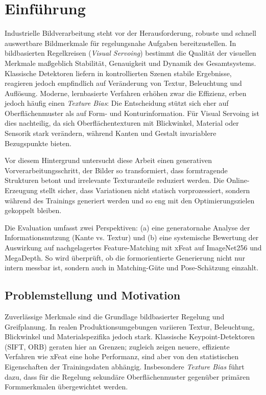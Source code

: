 \chapter{Einführung}
\label{ch:Einfuehrung}

Industrielle Bildverarbeitung steht vor der Herausforderung, robuste und schnell auswertbare Bildmerkmale für regelungsnahe Aufgaben bereitzustellen. In bildbasierten Regelkreisen (\emph{Visual Servoing}) bestimmt die Qualität der visuellen Merkmale maßgeblich Stabilität, Genauigkeit und Dynamik des Gesamtsystems. Klassische Detektoren liefern in kontrollierten Szenen stabile Ergebnisse, reagieren jedoch empfindlich auf Veränderung von Textur, Beleuchtung und Auflösung. Moderne, lernbasierte Verfahren erhöhen zwar die Effizienz, erben jedoch häufig einen \emph{Texture Bias}: Die Entscheidung stützt sich eher auf Oberflächenmuster als auf Form- und Konturinformation. Für Visual Servoing ist dies nachteilig, da sich Oberflächentexturen mit Blickwinkel, Material oder Sensorik stark verändern, während Kanten und Gestalt invariablere Bezugspunkte bieten.

Vor diesem Hintergrund untersucht diese Arbeit einen generativen Vorverarbeitungsschritt, der Bilder so transformiert, dass formtragende Strukturen betont und irrelevante Texturanteile reduziert werden. Die Online-Erzeugung stellt sicher, dass Variationen nicht statisch vorprozessiert, sondern während des Trainings generiert werden und so eng mit den Optimierungszielen gekoppelt bleiben.

Die Evaluation umfasst zwei Perspektiven: (a) eine generatornahe Analyse der Informationsnutzung (Kante vs. Textur) und (b) eine systemische Bewertung der Auswirkung auf nachgelagertes Feature-Matching mit \ac{xFeat} auf ImageNet256 und MegaDepth. So wird überprüft, ob die formorientierte Generierung nicht nur intern messbar ist, sondern auch in Matching-Güte und Pose-Schätzung einzahlt.


\section{Problemstellung und Motivation}
\label{sec:Problemstellung_Motivation}

Zuverlässige Merkmale sind die Grundlage bildbasierter Regelung und Greifplanung. In realen Produktionsumgebungen variieren Textur, Beleuchtung, Blickwinkel und Materialspezifika jedoch stark. Klassische Keypoint-Detektoren (\ac{SIFT}, \ac{ORB}) geraten hier an Grenzen; zugleich zeigen neuere, effiziente Verfahren wie \ac{xFeat} eine hohe Performanz, sind aber von den statistischen Eigenschaften der Trainingsdaten abhängig. Insbesondere \emph{Texture Bias} führt dazu, dass für die Regelung sekundäre Oberflächenmuster gegenüber primären Formmerkmalen übergewichtet werden.

